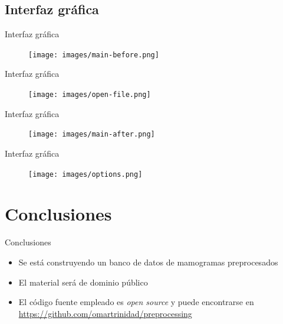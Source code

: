 \documentclass{beamer}
\begin{document}
\subsection{Interfaz gráfica}
\begin{frame}{Interfaz gráfica}
\transdissolve
  \pause
  \begin{figure}
    \centering
     \texttt{[image: images/main-before.png]}
  \end{figure}
\end{frame}

\begin{frame}{Interfaz gráfica}
\transdissolve
  \begin{figure}
    \centering
     \texttt{[image: images/open-file.png]}
  \end{figure}
\end{frame}

\begin{frame}{Interfaz gráfica}
\transdissolve
  \begin{figure}
    \centering
     \texttt{[image: images/main-after.png]}
  \end{figure}
\end{frame}

\begin{frame}{Interfaz gráfica}
\transdissolve
  \begin{figure}
    \centering
     \texttt{[image: images/options.png]}
  \end{figure}
\end{frame}

\section{Conclusiones}
\begin{frame}{Conclusiones}
\transdissolve
  \pause
  \begin{itemize}[<+-| alert@+ >]
    \item Se está construyendo un banco de datos de mamogramas preprocesados
    \item El material será de dominio público
    \item El código fuente empleado es \textit{open source} y puede encontrarse en {\small \url{https://github.com/omartrinidad/preprocessing}}
  \end{itemize}
\end{frame}
\end{document}
